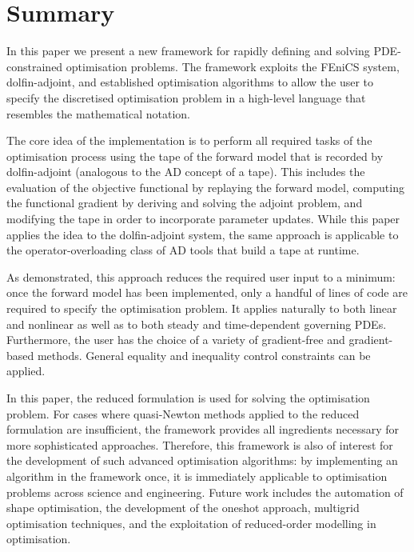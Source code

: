 \documentclass[prodmode,acmtoms]{acmsmall}
\newcommand{\fenics}{{\mbox{FEniCS}}\xspace}
\newcommand{\da}{\mbox{{dolfin-adjoint}}\xspace}
\begin{document}
\section{Summary}\label{sec:summary}
In this paper we present a new framework for rapidly defining and solving PDE-constrained optimisation problems.
The framework exploits the \fenics system, \da, and established optimisation algorithms to allow the user
to specify the discretised optimisation problem in a high-level language that resembles the mathematical notation.

The core idea of the implementation is to perform all required tasks of the optimisation process using the tape of the forward model that is recorded by \da 
(analogous to the AD concept of a tape).
This includes the evaluation of the objective functional by replaying the forward model,
computing the functional gradient by deriving and solving the adjoint problem, 
and modifying the tape in order to incorporate parameter updates.
While this paper applies the idea to the \da system, the same approach is applicable to the operator-overloading class of AD tools that build a tape at runtime.

As demonstrated, this approach reduces the required user input to a minimum: once the forward model has been implemented, 
only a handful of lines of code are required to specify the optimisation problem.
It applies naturally to both linear and nonlinear as well as to both steady and time-dependent governing PDEs.
Furthermore, the user has the choice of a variety of gradient-free and gradient-based methods.
General equality and inequality control constraints can be applied.

In this paper, the reduced formulation is used for solving the optimisation problem. 
For cases where quasi-Newton methods applied to the reduced formulation are insufficient, 
the framework provides all ingredients necessary for more sophisticated approaches.
Therefore, this framework is also of interest for the development of such advanced optimisation algorithms: by implementing an algorithm
in the framework once, it is immediately applicable to optimisation problems across science and engineering.
Future work includes the automation of shape optimisation, the development of the oneshot approach, multigrid optimisation techniques, and the exploitation of reduced-order
modelling in optimisation.



\end{document}
